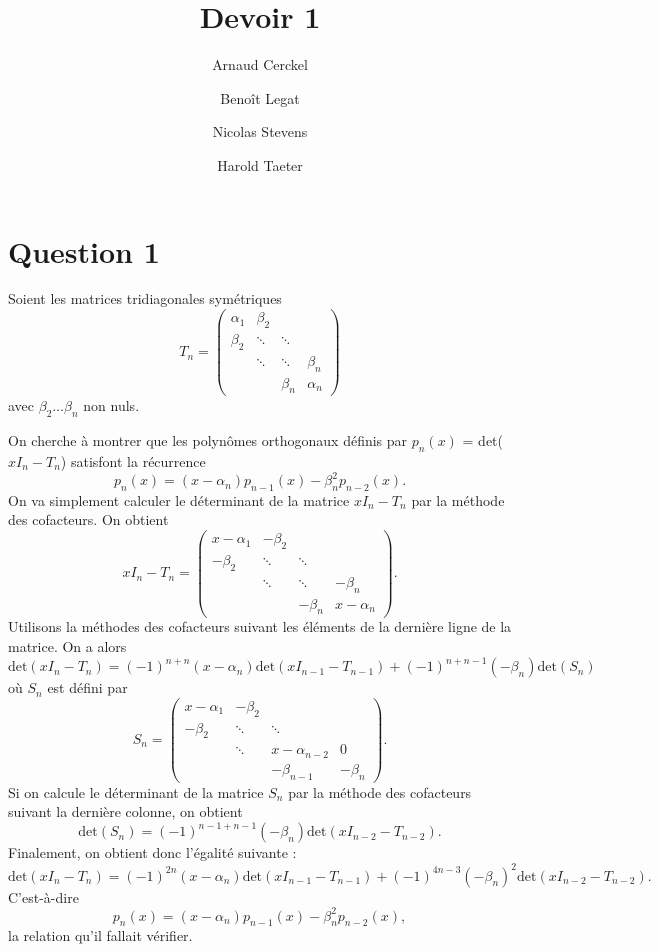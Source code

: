 \documentclass{article}
\title{Devoir 1}
\author{Arnaud Cerckel \and Benoît Legat \and
Nicolas Stevens \and Harold Taeter}
\begin{document}
\maketitle

\section*{Question 1}
Soient les matrices tridiagonales symétriques
$$T_n =
\begin{pmatrix}
\alpha_1 & \beta_2 & & \\
\beta_2 & \ddots & \ddots & \\
 & \ddots & \ddots & \beta_n \\
 & & \beta_n & \alpha_n
\end{pmatrix}
$$
avec $\beta_2 \hdots \beta_n$ non nuls.

On cherche à montrer que les polynômes orthogonaux définis par $p_n(x)$ = det($x I_n - T_n$) satisfont la récurrence $$p_n(x) = (x-\alpha_n)p_{n-1}(x) - \beta_n^2 p_{n-2}(x).$$
On va simplement calculer le déterminant de la matrice $x I_n - T_n$ par la méthode des cofacteurs. On obtient
$$x I_n - T_n =
\begin{pmatrix}
x-\alpha_1 & -\beta_2 & & \\
-\beta_2 & \ddots & \ddots & \\
 & \ddots & \ddots & -\beta_n \\
 & & -\beta_n & x-\alpha_n
\end{pmatrix}.
$$
Utilisons la méthodes des cofacteurs suivant les éléments de la dernière ligne de la matrice. On a alors $$\text{det}(x I_n - T_n) = (-1)^{n+n}(x-\alpha_n)\text{det}(x I_{n-1} - T_{n-1}) + (-1)^{n+n-1}(-\beta_n)\text{det}(S_n)$$ où $S_n$ est défini par
$$S_n =
\begin{pmatrix}
x-\alpha_1 & -\beta_2 & & \\
-\beta_2 & \ddots & \ddots & \\
 & \ddots & x-\alpha_{n-2} & 0 \\
 & & -\beta_{n-1} & -\beta_n
\end{pmatrix}.
$$
Si on calcule le déterminant de la matrice $S_n$ par la méthode des cofacteurs suivant la dernière colonne, on obtient $$\text{det}(S_n) = (-1)^{n-1+n-1}(-\beta_n)\text{det}(x I_{n-2} - T_{n-2}).$$
Finalement, on obtient donc l'égalité suivante : $$\text{det}(x I_n - T_n) = (-1)^{2n}(x-\alpha_n)\text{det}(x I_{n-1} - T_{n-1}) + (-1)^{4n-3}(-\beta_n)^2\text{det}(x I_{n-2} - T_{n-2}).$$
C'est-à-dire $$p_n(x) = (x-\alpha_n)p_{n-1}(x) - \beta_n^2 p_{n-2}(x),$$ la relation qu'il fallait vérifier.
\end{document}
